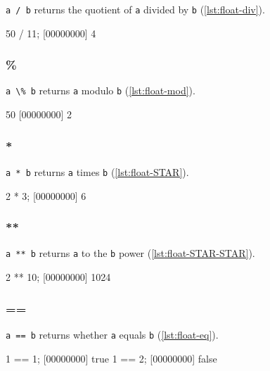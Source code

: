 \lstinline|a / b| returns the quotient of \lstinline|a| divided by
\lstinline|b| (\autoref{lst:float-div}).

\begin{urbiscript}[caption=Float.'/', label=lst:float-div, float=\floatposh]
  50 / 11;
  [00000000] 4
\end{urbiscript}

\subsubsection{\%}

\lstinline|a \% b| returns \lstinline|a| modulo \lstinline|b| (\autoref{lst:float-mod}).

\begin{urbiscript}[caption=Float.'\%', label=lst:float-mod, float=\floatposh]
  50 %
  [00000000] 2
\end{urbiscript}

\subsubsection{*}

\lstinline|a * b| returns \lstinline|a| times \lstinline|b| (\autoref{lst:float-STAR}).

\begin{urbiscript}[caption=Float.'*', label=lst:float-STAR, float=\floatposh]
  2 * 3;
  [00000000] 6
\end{urbiscript}

\subsubsection{**}

\lstinline|a ** b| returns \lstinline|a| to the \lstinline|b| power (\autoref{lst:float-STAR-STAR}).

\begin{urbiscript}[caption=Float.'**', label=lst:float-STAR-STAR, float=\floatposh]
  2 ** 10;
  [00000000] 1024
\end{urbiscript}

\subsubsection{==}

\lstinline|a == b| returns whether \lstinline|a| equals \lstinline|b| (\autoref{lst:float-eq}).

\begin{urbiscript}[caption={Float.'=='}, label=lst:float-eq, float=\floatposh]
  1 == 1;
  [00000000] true
  1 == 2;
  [00000000] false
\end{urbiscript}
